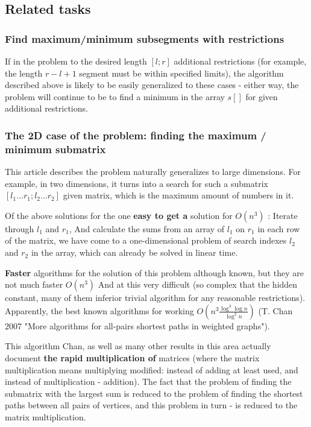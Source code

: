 \subsection{ Related tasks }

\subsubsection{ Find maximum/minimum subsegments with restrictions }

If in the problem to the desired length $[l; r]$ additional restrictions (for example, the length $r-l +1$ segment must be within specified limits), the algorithm described above is likely to be easily generalized to these cases - either way, the problem will continue to be to find a minimum in the array $s []$ for given additional restrictions.

\subsubsection{ The 2D case of the problem: finding the maximum / minimum submatrix }

This article describes the problem naturally generalizes to large dimensions. For example, in two dimensions, it turns into a search for such a submatrix $[l_1 \ldots r_1; l_2 \ldots r_2]$ given matrix, which is the maximum amount of numbers in it.

Of the above solutions for the one \textbf{easy to get a} solution for $O (n ^ 3)$ : Iterate through $l_1$ and $r_1$, And calculate the sums from an array of $l_1$ on $r_1$ in each row of the matrix, we have come to a one-dimensional problem of search indexes $l_2$ and $r_2$ in the array, which can already be solved in linear time.

\textbf{Faster} algorithms for the solution of this problem although known, but they are not much faster $O (n ^ 3)$ And at this very difficult (so complex that the hidden constant, many of them inferior trivial algorithm for any reasonable restrictions). Apparently, the best known algorithms for working $O \left (n ^ 3 \frac {\log ^ 3 \log n} {\log ^ 2 n} \right)$ (T. Chan 2007 "More algorithms for all-pairs shortest paths in weighted graphs").

This algorithm Chan, as well as many other results in this area actually document \textbf{the rapid multiplication of} matrices (where the matrix multiplication means multiplying modified: instead of adding at least used, and instead of multiplication - addition). The fact that the problem of finding the submatrix with the largest sum is reduced to the problem of finding the shortest paths between all pairs of vertices, and this problem in turn - is reduced to the matrix multiplication.

